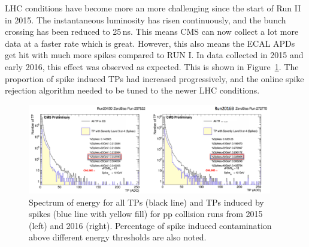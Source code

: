 LHC conditions have become more an more challenging since the start of Run II in 2015. The instantaneous luminosity has risen continuously, and the bunch crossing has been reduced to 25\,ns. This means CMS can now collect a lot more data at a faster rate which is great. However, this also means the ECAL APDs get hit with much more spikes compared to RUN I. In data collected in 2015 and early 2016, this effect was observed as expected. This is shown in Figure~\ref{fig:spike_fraction}. The proportion of spike induced TPs had increased progressively, and the online spike rejection algorithm needed to be tuned to the newer LHC conditions.    


\begin{figure}
  \begin{center}
  \captionsetup{width=.94\textwidth,justification=centering}
  \includegraphics[width=0.95\textwidth,keepaspectratio]{plots_and_figures/chapter3/spike_fraction.png}
\caption{Spectrum of energy for all TPs (black line) and TPs induced by spikes (blue line with yellow fill) for pp collision runs from 2015 (left) and 2016 (right). Percentage of spike induced contamination above different energy thresholds are also noted.}
\label{fig:spike_fraction}
\end{center}
\end{figure}

